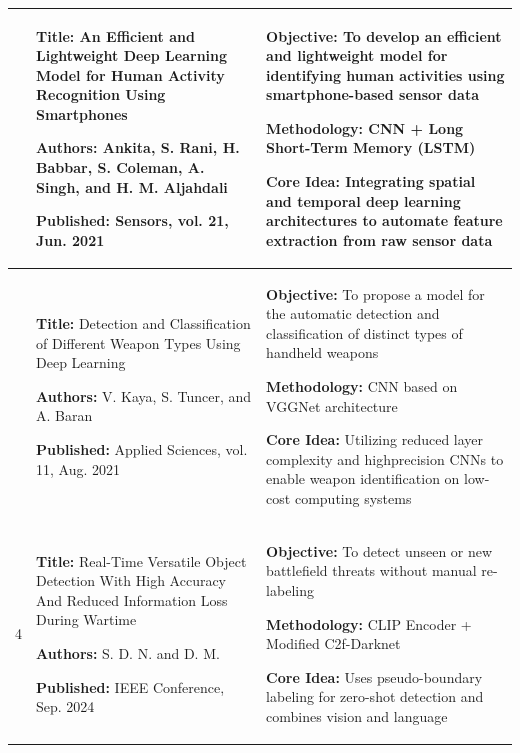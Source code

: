 \begin{center}
\begin{longtable}{
        |>{\centering\arraybackslash}p{1.22cm}
        |>{\raggedright\arraybackslash}p{6.3cm}
        |>{\raggedright\arraybackslash}p{6.3cm}|
        }
        2                                                                                            &
        \textbf{Title:} An Efficient and Lightweight Deep Learning Model for Human Activity Recognition Using Smartphones \par
        \textbf{Authors:} Ankita, S. Rani, H. Babbar, S. Coleman, A. Singh, and H. M. Aljahdali \par
        \textbf{Published:} Sensors, vol. 21, Jun. 2021                                              &
        \textbf{Objective:} To develop an efficient and lightweight model for identifying human activities using smartphone-based sensor data \par
        \textbf{Methodology:} CNN + Long Short-Term Memory (LSTM) \par
        \textbf{Core Idea:} Integrating spatial and temporal deep learning architectures to automate feature extraction from raw sensor data                                                             \\
        \hline

        3                                                                                            &
        \textbf{Title:} Detection and Classification of Different Weapon Types Using Deep Learning \par
        \textbf{Authors:} V. Kaya, S. Tuncer, and A. Baran \par
        \textbf{Published:} Applied Sciences, vol. 11, Aug. 2021                                     &
        \textbf{Objective:} To propose a model for the automatic detection and classification of distinct types of handheld weapons \par
        \textbf{Methodology:} CNN based on VGGNet architecture \par
        \textbf{Core Idea:} Utilizing reduced layer complexity and highprecision CNNs to enable weapon identification on low-cost computing systems                                                      \\
        \hline

        4                                                                                            &
        \textbf{Title:} Real-Time Versatile Object Detection With High Accuracy And Reduced Information Loss During Wartime \par
        \textbf{Authors:} S. D. N. and D. M. \par
        \textbf{Published:} IEEE Conference, Sep. 2024                                               &
        \textbf{Objective:} To detect unseen or new battlefield threats without manual re-labeling \par
        \textbf{Methodology:} CLIP Encoder + Modified C2f-Darknet \par
        \textbf{Core Idea:} Uses pseudo-boundary labeling for zero-shot detection and combines vision and language                                                                                       \\
        \hline


\end{longtable}
\end{center}
